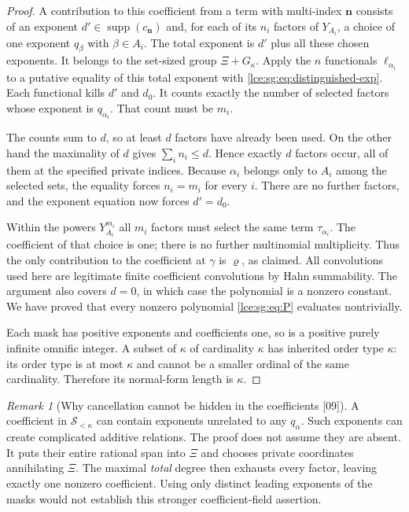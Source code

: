 \documentclass[11pt,letterpaper]{article}
\numberwithin{equation}{section}
\theoremstyle{definition}
\theoremstyle{remark}
\newtheorem{remark}[theorem]{Remark}
\newcommand{\supp}{\operatorname{supp}}
\newcommand{\Sk}{\mathscr S_{<\kappa}}
\newcommand{\src}[1]{\textup{\textsf{\small[#1]}}}%
\begin{document}
\begin{proof}
A contribution to this coefficient from a term with multi-index
$\mathbf n$ consists of an exponent $d'\in\supp(c_{\mathbf n})$ and, for
each of its $n_i$ factors of $Y_{A_i}$, a choice of one exponent $q_\beta$
with $\beta\in A_i$. The total exponent is $d'$ plus all these chosen
exponents. It belongs to the set-sized group $\Xi+G_\kappa$. Apply the $n$
functionals $\ell_{\alpha_i}$ to a putative equality of this total exponent
with \eqref{lce:sg:eq:distinguished-exp}. Each functional kills $d'$ and
$d_0$. It counts exactly the number of selected factors whose exponent is
$q_{\alpha_i}$. That count must be $m_i$.

The counts sum to $d$, so at least $d$ factors have already been used. On
the other hand the maximality of $d$ gives $\sum_i n_i\le d$. Hence exactly
$d$ factors occur, all of them at the specified private indices. Because
$\alpha_i$ belongs only to $A_i$ among the selected sets, the equality forces
$n_i=m_i$ for every $i$. There are no further factors, and the exponent
equation now forces $d'=d_0$.

Within the powers $Y_{A_i}^{m_i}$ all $m_i$ factors must select the same term
$\tau_{\alpha_i}$. The coefficient of that choice is one; there is no further
multinomial multiplicity. Thus the only contribution to the coefficient at
$\gamma$ is $\varrho$, as claimed. All convolutions used here are legitimate
finite coefficient convolutions by Hahn summability. The argument also
covers $d=0$, in which case the polynomial is a nonzero constant. We have
proved that every nonzero polynomial \eqref{lce:sg:eq:P} evaluates
nontrivially.

Each mask has positive exponents and coefficients one, so is a positive
purely infinite omnific integer. A subset of $\kappa$ of cardinality
$\kappa$ has inherited order type $\kappa$: its order type is at most
$\kappa$ and cannot be a smaller ordinal of the same cardinality. Therefore
its normal-form length is $\kappa$.
\end{proof}

\begin{remark}[Why cancellation cannot be hidden in the coefficients \src{09}]
A coefficient in $\Sk$ can contain exponents unrelated to any $q_\alpha$.
Such exponents can create complicated additive relations. The proof does
not assume they are absent. It puts their entire rational span into $\Xi$
and chooses private coordinates annihilating $\Xi$. The maximal
\emph{total} degree then exhausts every factor, leaving exactly one nonzero
coefficient. Using only distinct leading exponents of the masks would not
establish this stronger coefficient-field assertion.
\end{remark}
\end{document}
